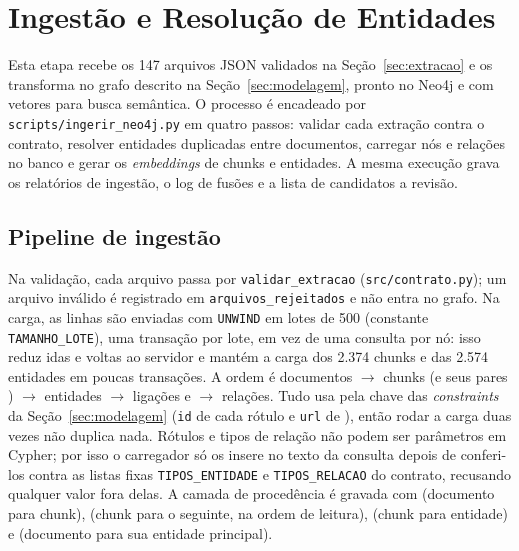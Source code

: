 %
%

\section{Ingestão e Resolução de Entidades}
\label{sec:ingestao}

Esta etapa recebe os 147 arquivos JSON validados na Seção~\ref{sec:extracao} e os transforma no grafo descrito na Seção~\ref{sec:modelagem}, pronto no Neo4j e com vetores para busca semântica. O processo é encadeado por \texttt{scripts/ingerir\_neo4j.py} em quatro passos: validar cada extração contra o contrato, resolver entidades duplicadas entre documentos, carregar nós e relações no banco e gerar os \emph{embeddings} de chunks e entidades. A mesma execução grava os relatórios de ingestão, o log de fusões e a lista de candidatos a revisão.

\subsection{Pipeline de ingestão}

Na validação, cada arquivo passa por \texttt{validar\_extracao} (\texttt{src/contrato.py}); um arquivo inválido é registrado em \texttt{arquivos\_rejeitados} e não entra no grafo. Na carga, as linhas são enviadas com \texttt{UNWIND} em lotes de 500 (constante \texttt{TAMANHO\_LOTE}), uma transação por lote, em vez de uma consulta por nó: isso reduz idas e voltas ao servidor e mantém a carga dos 2.374 chunks e das 2.574 entidades em poucas transações. A ordem é documentos $\rightarrow$ chunks (e seus pares ) $\rightarrow$ entidades $\rightarrow$ ligações  e  $\rightarrow$ relações. Tudo usa  pela chave das \emph{constraints} da Seção~\ref{sec:modelagem} (\texttt{id} de cada rótulo e \texttt{url} de ), então rodar a carga duas vezes não duplica nada. Rótulos e tipos de relação não podem ser parâmetros em Cypher; por isso o carregador só os insere no texto da consulta depois de conferi-los contra as listas fixas \texttt{TIPOS\_ENTIDADE} e \texttt{TIPOS\_RELACAO} do contrato, recusando qualquer valor fora delas. A camada de procedência é gravada com  (documento para chunk),  (chunk para o seguinte, na ordem de leitura),  (chunk para entidade) e  (documento para sua entidade principal).

